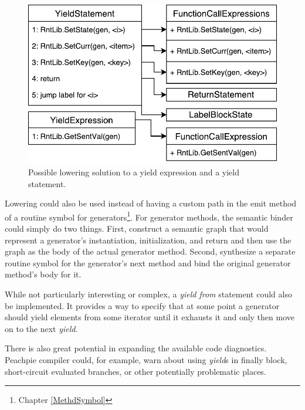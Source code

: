 \begin{figure}[h]
	\centering	
	\includegraphics[scale=0.75]{../img/6_6_yieldLowering}	
	\caption{Possible lowering solution to a yield expression and a yield statement.}
	\label{fig5.5:YieldInCond}
\end{figure}

Lowering could also be used instead of having a custom path in the emit method of a routine symbol for generators\footnote{Chapter \ref{MethdSymbol}}. For generator methods, the semantic binder could simply do two things. First, construct a semantic graph that would represent a generator’s instantiation, initialization, and return and then use the graph as the body of the actual generator method. Second, synthesize a separate routine symbol for the generator's next method and bind the original generator method’s body for it.

While not particularly interesting or complex, a \emph{yield from} statement could also be implemented. It provides a way to specify that at some point a generator should yield elements from some iterator until it exhausts it and only then move on to the next \emph{yield}.

There is also great potential in expanding the available code diagnostics. Peachpie compiler could, for example, warn about using \emph{yield}s in finally block, short-circuit evaluated branches, or other potentially problematic places.


